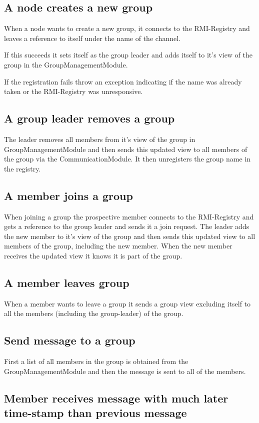 \documentclass[11pt,swedish]{article}
\begin{document}
\subsection{A node creates a new group}
When a node wants to create a new group, it connects to the RMI-Registry and leaves a reference to itself under the name of the channel.

If this succeeds it sets itself as the group leader and adds itself to it's view of the group in the GroupManagementModule.

If the registration fails throw an exception indicating if the name was already taken or the RMI-Registry was unresponsive.

\subsection{A group leader removes a group}
The leader removes all members from it's view of the group in GroupManagementModule and then sends this updated view to all members of the group via the CommunicationModule. It then unregisters the group name in the registry.

\subsection{A member joins a group}
When joining a group the prospective member connects to the RMI-Registry and gets a reference to the group leader and sends it a join request. The leader adds the new member to it's view of the group and then sends this updated view to all members of the group, including the new member. When the new member receives the updated view it knows it is part of the group.

\subsection{A member leaves group}
When a member wants to leave a group it sends a group view excluding itself to all the members (including the group-leader) of the group.

\subsection{Send message to a group}
First a list of all members in the group is obtained from the GroupManagementModule and then the message is sent to all of the members.

\subsection{Member receives message with much later time-stamp than previous message}
\end{document}
